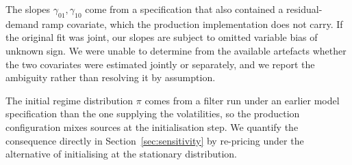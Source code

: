 The slopes $\gamma_{01},\gamma_{10}$ come from a specification that also
contained a residual-demand ramp covariate, which the production implementation
does not carry. If the original fit was joint, our slopes are subject to omitted
variable bias of unknown sign. We were unable to determine from the available
artefacts whether the two covariates were estimated jointly or separately, and
we report the ambiguity rather than resolving it by assumption.

The initial regime distribution $\pi$ comes from a filter run under an earlier
model specification than the one supplying the volatilities, so the production
configuration mixes sources at the initialisation step. We quantify the
consequence directly in Section~\ref{sec:sensitivity} by re-pricing under the
alternative of initialising at the stationary distribution.
